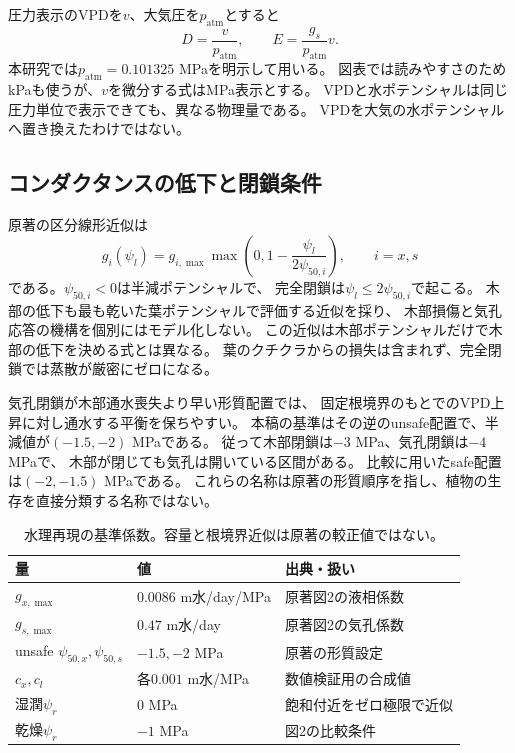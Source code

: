 \documentclass[a4paper,11pt]{ltjsarticle}
\begin{document}
圧力表示のVPDを$v$、大気圧を$p_{\mathrm{atm}}$とすると
\begin{equation}\label{eq:vpd}
 D=\frac{v}{p_{\mathrm{atm}}},\qquad E=\frac{g_s}{p_{\mathrm{atm}}}v .
\end{equation}
本研究では$p_{\mathrm{atm}}=0.101325$ MPaを明示して用いる。
図表では読みやすさのためkPaも使うが、$v$を微分する式はMPa表示とする。
VPDと水ポテンシャルは同じ圧力単位で表示できても、異なる物理量である。
VPDを大気の水ポテンシャルへ置き換えたわけではない。

\subsection{コンダクタンスの低下と閉鎖条件}
原著の区分線形近似は
\begin{equation}\label{eq:conductance}
 g_i(\psi_l)=g_{i,\max}\max\left(0,1-\frac{\psi_l}{2\psi_{50,i}}\right),
 \qquad i=x,s
\end{equation}
である。$\psi_{50,i}<0$は半減ポテンシャルで、
完全閉鎖は$\psi_l\le2\psi_{50,i}$で起こる。
木部の低下も最も乾いた葉ポテンシャルで評価する近似を採り、
木部損傷と気孔応答の機構を個別にはモデル化しない。
この近似は木部ポテンシャルだけで木部の低下を決める式とは異なる。
葉のクチクラからの損失は含まれず、完全閉鎖では蒸散が厳密にゼロになる。

気孔閉鎖が木部通水喪失より早い形質配置では、
固定根境界のもとでのVPD上昇に対し通水する平衡を保ちやすい。
本稿の基準はその逆のunsafe配置で、半減値が$(-1.5,-2)$ MPaである。
従って木部閉鎖は$-3$ MPa、気孔閉鎖は$-4$ MPaで、
木部が閉じても気孔は開いている区間がある。
比較に用いたsafe配置は$(-2,-1.5)$ MPaである。
これらの名称は原著の形質順序を指し、植物の生存を直接分類する名称ではない。

\begin{table}[tb]
\centering
\caption{水理再現の基準係数。容量と根境界近似は原著の較正値ではない。}
\begin{tabular}{lll}
\toprule
量 & 値 & 出典・扱い\\ \midrule
$g_{x,\max}$ & $0.0086$ m水/day/MPa & 原著図2の液相係数\\
$g_{s,\max}$ & $0.47$ m水/day & 原著図2の気孔係数\\
unsafe $\psi_{50,x},\psi_{50,s}$ & $-1.5,-2$ MPa & 原著の形質設定\\
$c_x,c_l$ & 各$0.001$ m水/MPa & 数値検証用の合成値\\
湿潤$\psi_r$ & $0$ MPa & 飽和付近をゼロ極限で近似\\
乾燥$\psi_r$ & $-1$ MPa & 図2の比較条件\\
\bottomrule
\end{tabular}
\end{table}
\end{document}
